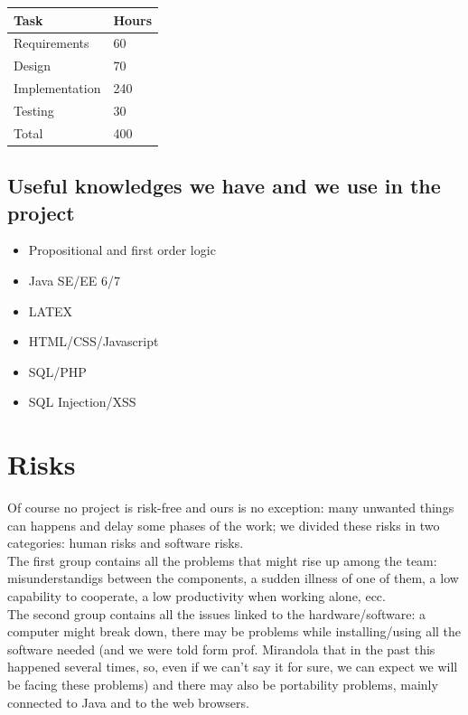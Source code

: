 \documentclass[a4paper,12pt]{article}
\begin{document}
\begin{center}
\begin{tabular}{|l|l|}
\hline \textbf{Task} & \textbf{Hours} \\
\hline Requirements & 60 \\
\hline Design & 70 \\
\hline Implementation & 240 \\
\hline Testing & 30 \\
\hline Total & 400 \\
\hline 
\end{tabular}
\end{center}

\subsection{Useful knowledges we have and we use in the project}
\begin{itemize}
\item Propositional and first order logic
\item Java SE/EE 6/7
\item LATEX
\item HTML/CSS/Javascript
\item SQL/PHP
\item SQL Injection/XSS
\end{itemize}

\clearpage

\section{Risks}
Of course no project is risk-free and ours is no exception: many unwanted things can happens and delay some phases of the work; we divided these risks in two categories: human risks and software risks.\\[1\baselineskip]The first group contains all the problems that might rise up among the team: misunderstandigs between the components, a sudden illness of one of them, a low capability to cooperate, a low productivity when working alone, ecc.\\[1\baselineskip]The second group contains all the issues linked to the hardware/software: a computer might break down, there may be problems while installing/using all the software needed (and we were told form prof. Mirandola that in the past this happened several times, so, even if we can’t say it for sure, we can expect we will be facing these problems) and there may also be portability problems, mainly connected to Java and to the web browsers.\\[1\baselineskip]
\end{document}
